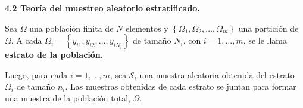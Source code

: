 \documentclass[12pt]{article}
\begin{document}
	\textbf{4.2 Teoría del muestreo aleatorio estratificado.}

	Sea $ \Omega $ una población finita de $ N $ elementos y $ \left\lbrace \Omega_1, \Omega_2, \ldots, \Omega_m \right\rbrace $ una partición de $ \Omega $. A cada $ \Omega_i = \left\lbrace y_{i1}, y_{i2}, \ldots, y_{i N_i} \right\rbrace $ de tamaño $ N_i $, con $ i = 1, \ldots, m $, se le llama \textbf{estrato de la población}.

    Luego, para cada $ i = 1, \ldots, m $, sea $ \mathcal{S}_i $ una muestra aleatoria obtenida del estrato $ \Omega_i $ de tamaño $ n_i $. Las muestras obtenidas de cada estrato se juntan para formar una muestra de la población total, $ \Omega $.
\end{document}
